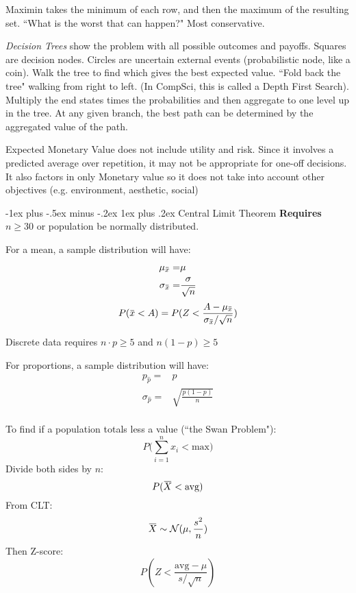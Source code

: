 \documentclass[10pt,landscape]{article}
\makeatletter
\renewcommand{\subsubsection}{\@startsection{subsubsection}{3}{0mm}%
                                {-1ex plus -.5ex minus -.2ex}%
                                {1ex plus .2ex}%
                                {\normalfont\small\bfseries}}
\newcommand{\overbar}[1]{\mkern 1.5mu\overline{\mkern-1.5mu#1\mkern-1.5mu}\mkern 1.5mu}
\makeatother
\begin{document}
\begin{multicols*}{3}
Maximin takes the minimum of each row, and then the maximum of the resulting set. ``What is the worst that can happen?" Most conservative.

\textit{Decision Trees} show the problem with all possible outcomes and payoffs. Squares are decision nodes. Circles are uncertain external events (probabilistic node, like a coin). Walk the tree to find which gives the best expected value. ``Fold back the tree" walking from right to left. (In CompSci, this is called a Depth First Search). Multiply the end states times the probabilities and then aggregate to one level up in the tree. At any given branch, the best path can be determined by the aggregated value of the path.

Expected Monetary Value does not include utility and risk. Since it involves a predicted average over repetition, it may not be appropriate for one-off decisions. It also factors in only Monetary value so it does not take into account other objectives (e.g. environment, aesthetic, social)


\subsubsection{Central Limit Theorem}
\textbf{Requires} $n \geq 30$ or population be normally distributed.

For a mean, a sample distribution will have:
\begin{align*}
\mu_{\overbar{x}} =& \mu \\
\sigma_{\overbar{x}} =& \frac{\sigma} { \sqrt{n}}\\
\end{align*}
\[
P(\overbar{x} < A) = P (Z < \frac{A - \mu_{\overbar{x}}} {\sigma_{\overbar{x}} / \sqrt{n} })
\]

Discrete data requires $n\cdot p \geq 5$ and $n(1-p) \geq 5$

For proportions, a sample distribution will have:
\begin{align*}
p_{\hat{p}} =& p \\
\sigma_{\hat{p}} =& \sqrt{\frac{p(1-p)} { n}  }\\
\end{align*}

To find if a population totals less a value (``the Swan Problem"):
\[
P\bigg(\sum\limits_{i=1}^{n} x_i < \text{max}\bigg)
\]
Divide both sides by $n$:
\[
P(\overbar{X} < \text{avg})
\]
From CLT:
\[
\overbar{X} \sim \mathcal{N}(\mu, \frac{s^2}{n})
\]
Then Z-score:
\[
P(Z < \frac{ \text{avg} - \mu } { s / \sqrt{n}})
\]


\end{multicols*}
\end{document}
